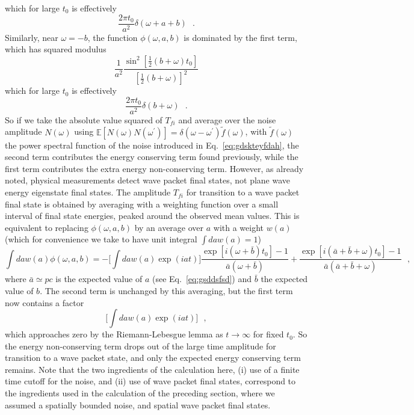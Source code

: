 \documentclass[12pt,onecolumn,amssymb,nofootinbib]{revtex4-2} %
\begin{document}
which for large $t_0$ is effectively
\begin{equation}\label{eq:largetime1}
\frac{2\pi t_0}{a^2} \delta(\omega+a+b)~~~.
\end{equation}
Similarly, near $\omega=-b$, the function $\phi(\omega,a,b)$ is dominated by the first term,
which has squared modulus
\begin{equation}\label{eq:secondterm}
\frac{1}{a^2} \frac{\sin^2{[\frac{1}{2}(b+\omega)t_0]} } {[\frac{1}{2}(b+\omega)]^2}
\end{equation}
which for large $t_0$ is effectively
\begin{equation}\label{eq:largetime2}
\frac{2\pi t_0}{a^2} \delta(b+\omega)~~~.
\end{equation}
So if we take the absolute value squared of $T_{fi}$ and average over the noise amplitude
$N(\omega)$ using $ \mathbb{E}[N(\omega)N(\omega^{\prime})]=\delta(\omega-\omega^{\prime})\tilde{f}(\omega)$,
with $\tilde{f}(\omega)$ the power spectral function of the noise introduced in Eq.~\eqref{eq:gdskteyfdah}, the second term contributes
the energy conserving term found previously, while the first term contributes the extra energy
non-conserving term. However, as already noted, physical measurements detect wave packet
final states, not plane wave energy eigenstate final states.  The amplitude $T_{fi}$ for transition
to a wave packet final state is obtained by averaging with a weighting function over a small interval
of final state energies, peaked around the observed mean values. This is equivalent to replacing $\phi(\omega,a,b)$ by an average
over $a$ with a weight $w(a)$ (which for convenience we take to have unit integral $\int da w(a) =1$)
\begin{equation}\label{eq:averagephi}
\int da w(a) \phi(\omega,a,b)= -\Big[\int da w(a)\exp{(iat)}\Big] \frac{\exp{[i(\omega+\bar{b}) t_0]}-1}{\bar{a}(\omega +\bar{b})}
+ \frac{\exp{[i(\bar{a}+\bar{b}+\omega) t_0]} -1}{\bar{a}(\bar{a}+\bar{b}+\omega)}~~~,
\end{equation}
where $\bar{a} \simeq pc$ is the expected value of $a$ (see Eq.~\eqref{eq:gsddsfsd}) and $\bar{b}$ the expected value of $b$.
The second term is unchanged by this averaging, but the first term now contains a factor
\begin{equation}\label{eq:averagefirst}
\Big[\int da w(a)\exp{(iat)}\Big]~~~,
\end{equation}
which approaches zero by the Riemann-Lebesgue lemma as $t\to \infty$ for fixed $t_0$.  So the
energy non-conserving term drops out of the large time amplitude for transition to a wave packet
state, and only the expected energy conserving term remains.  Note that the two ingredients of the
calculation here, (i) use of a finite time cutoff for the noise, and (ii) use of wave packet
final states, correspond to the ingredients used in the calculation of the preceding section, where
we assumed a spatially  bounded noise, and spatial wave packet final states.
\end{document}
